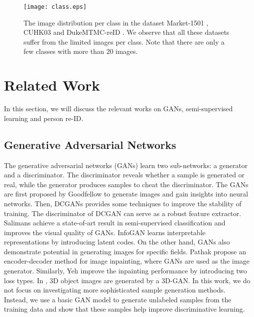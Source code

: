 \documentclass[10pt,twocolumn,letterpaper]{article}
\begin{document}
\begin{figure}[t]
\begin{center}
\texttt{[image: class.eps]}
\end{center}
\caption{The image distribution per class in the dataset Market-1501 \cite{zheng2015scalable}, CUHK03 \cite{li2014deepreid} and DukeMTMC-reID \cite{ristani2016MTMC}. We observe that all these datasets suffer from the limited images per class. Note that there are only a few classes with more than 20 images.}
\label{fig:class}
\end{figure} 

\section{Related Work}
In this section, we will discuss the relevant works on GANs, semi-supervised learning and person re-ID.

\subsection{Generative Adversarial Networks}
The generative adversarial networks (GANs) learn two sub-networks: a generator and a discriminator. The discriminator reveals whether a sample is generated or real, while the generator produces samples to cheat the discriminator. The GANs are first proposed by Goodfellow \etal \cite{goodfellow2014generative} to generate images and gain insights into neural networks. Then, DCGANs \cite{radford2015unsupervised} provides some techniques to improve the stability of training. The discriminator of DCGAN can serve as a robust feature extractor. Salimans \etal \cite{salimans2016improved} achieve a state-of-art result in semi-supervised classification and improves the visual quality of GANs. InfoGAN \cite{chen2016infogan} learns interpretable representations by introducing latent codes. On the other hand, GANs also demonstrate potential in generating images for specific fields. Pathak \etal \cite{pathak2016context} propose an encoder-decoder method for image inpainting, where GANs are used as the image generator. Similarly, Yeh \etal \cite{yeh2016semantic} improve the inpainting performance by introducing two loss types. In \cite{wu2016learning}, 3D object images are generated by a 3D-GAN. In this work, we do not focus on investigating more sophisticated sample generation methods. Instead, we use a basic GAN model \cite{radford2015unsupervised} to generate unlabeled samples from the training data and show that these samples help improve discriminative learning.
\end{document}
